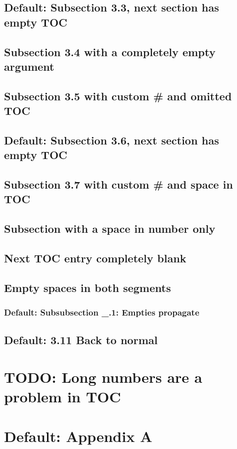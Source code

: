 \documentclass{homework}
\begin{document}
\subsection{Default: Subsection 3.3, next section has empty TOC}

\subsection[]{Subsection 3.4 with a completely empty argument}

\subsection[3.5|]{Subsection 3.5 with custom \# and omitted TOC}

\subsection{Default: Subsection 3.6, next section has empty TOC}

\subsection[3.7| ]{Subsection 3.7 with custom \# and space in TOC}

\subsection[ |]{Subsection with a space in number only}

\subsection[3.9]{Next TOC entry completely blank}

\subsection[ | ]{Empty spaces in both segments}

\subsubsection{Default: Subsubsection \_.1: Empties propagate}

\subsection{Default: 3.11 Back to normal}

\section[2011|]{TODO: Long numbers are a problem in TOC}

\appendix

\section{Default: Appendix A}
\end{document}
